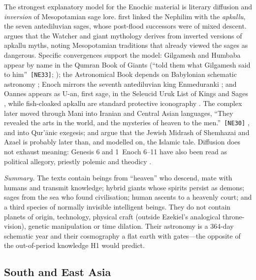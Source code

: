 \documentclass[11pt,a4paper]{article}
\newcommand{\pid}[1]{\texttt{\small #1}}
\begin{document}
The strongest explanatory model for the Enochic material is literary diffusion and \emph{inversion} of Mesopotamian sage lore. \textcite{kilmer1987nephilim} first linked the Nephilim with the \emph{apkallu}, the seven antediluvian sages, whose post-flood successors were of mixed descent. \textcite{annus2010watchers} argues that the Watcher and giant mythology derives from inverted versions of apkallu myths, noting Mesopotamian traditions that already viewed the sages as dangerous. Specific convergences support the model: Gilgamesh and Humbaba appear by name in the Qumran Book of Giants (\enquote{told them what Gilgamesh said to him}~\pid{[NE33]}; \cite{reeves1992jewish,stuckenbruck1997giants}); the Astronomical Book depends on Babylonian schematic astronomy \parencite{neugebauer1981astronomical,bendov2008head,drawnel2011astronomical}; Enoch mirrors the seventh antediluvian king Enmeduranki \parencite{vanderkam1984enoch,kvanvig1988roots}; and Oannes appears as U-an, first sage, in the Seleucid Uruk List of Kings and Sages \parencite{lenzi2008uruk}, while fish-cloaked apkallu are standard protective iconography \parencite{wiggermann1992protective}. The complex later moved through Mani into Iranian and Central Asian languages, \enquote{They revealed the arts in the world, and the mysteries of heaven to the men.}~\pid{[NE30]} \parencite{henning1943giants}, and into Qur'ānic exegesis; \textcite{crone2016watchers} and \textcite{reeves2015harut} argue that the Jewish Midrash of Shemhazai and Azael is probably later than, and modelled on, the Islamic tale. Diffusion does not exhaust meaning: Genesis 6 and 1~Enoch 6--11 have also been read as political allegory, priestly polemic and theodicy \parencite{nickelsburg1977myth,suter1979fallen,hanson1977rebellion,reed2005fallen}.

\emph{Summary.} The texts contain beings from ``heaven'' who descend, mate with humans and transmit knowledge; hybrid giants whose spirits persist as demons; sages from the sea who found civilisation; human ascents to a heavenly court; and a third species of normally invisible intelligent beings. They do not contain planets of origin, technology, physical craft (outside Ezekiel's analogical throne-vision), genetic manipulation or time dilation. Their astronomy is a 364-day schematic year and their cosmography a flat earth with gates---the opposite of the out-of-period knowledge H1 would predict.

\subsection{South and East Asia}\label{sec:asia}
\end{document}
